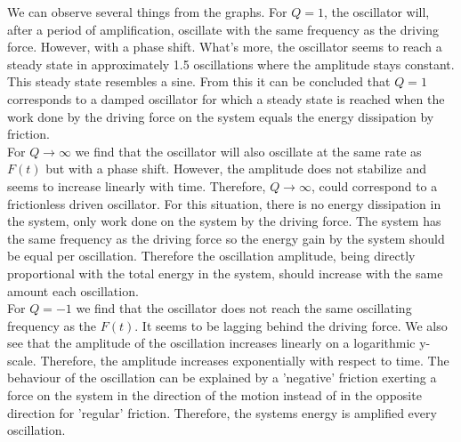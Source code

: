 We can observe several things from the graphs. For $Q = 1$, the oscillator will, after a period of amplification, oscillate with the same frequency as the driving force. However, with a phase shift. What's more, the oscillator seems to reach a steady state in approximately 1.5 oscillations where the amplitude stays constant. This steady state resembles a sine. From this it can be concluded that $Q = 1$ corresponds to a damped oscillator for which a steady state is reached when the work done by the driving force on the system equals the energy dissipation by friction. \\
For $Q \rightarrow \infty$ we find that the oscillator will also oscillate at the same rate as $F(t)$ but with a phase shift. However, the amplitude does not stabilize and seems to increase linearly with time. Therefore, $Q \rightarrow \infty$, could  correspond to a frictionless driven oscillator. For this situation, there is no energy dissipation in the system, only  work done on the system by the driving force. The system has the same frequency as the driving force so the energy gain by the system should be equal per oscillation. Therefore the oscillation amplitude, being directly proportional with the total energy in the system, should increase with the same amount each oscillation. \\
For $Q = -1$ we find that the oscillator does not reach the same oscillating frequency as the $F(t)$. It seems to be lagging behind the driving force. We also see that the amplitude of the oscillation increases linearly on a logarithmic y-scale. Therefore, the amplitude increases exponentially with respect to time. The behaviour of the oscillation can be explained by a 'negative' friction exerting a force on the system in the direction of the motion instead of in the opposite direction for 'regular' friction. Therefore, the systems energy is amplified every oscillation.  




 







